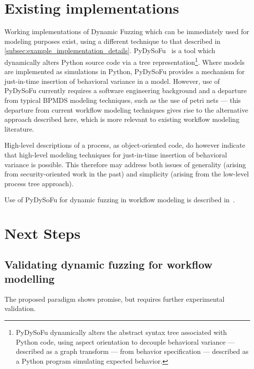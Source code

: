 \documentclass[12pt]{llncs}  %
\begin{document}
\section{Existing implementations}
Working implementations of Dynamic Fuzzing which can be immediately used for
modeling purposes exist, using a different technique to that described in
\cref{subsec:example_implementation_details}. PyDySoFu~\citep{pdsf} is a tool
which dynamically alters Python source code via a tree
representation\footnote{PyDySoFu dynamically alters the abstract
  syntax tree associated with Python code, using aspect orientation to decouple
  behavioral variance --- described as a graph transform --- from behavior
  specification --- described as a Python program simulating expected
  behavior.}. Where models are implemented as simulations in Python, PyDySoFu
provides a mechanism for just-in-time insertion of behavioral variance in a
model. However, use of PyDySoFu currently requires a software engineering
background and a departure from typical BPMDS modeling techniques, such as the
use of petri nets --- this departure from current workflow modeling techniques
gives rise to the alternative approach described here, which is more relevant to
existing workflow modeling literature.
\par

High-level descriptions of a process, as object-oriented code, do however
indicate that high-level modeling techniques for just-in-time insertion of
behavioral variance is possible. This therefore may address both issues of
generality (arising from security-oriented work in the past) and simplicity
(arising from the low-level process tree approach).
\par

Use of PyDySoFu for dynamic fuzzing in
workflow modeling is described in~\cite{wallis2018modelling}.
\par



\section{Next Steps}
\label{sec:future_work}
\label{sec:conclusion}
\subsection{Validating dynamic fuzzing for workflow modelling}
The proposed paradigm shows promise, but requires further experimental
validation.
\par
\end{document}
